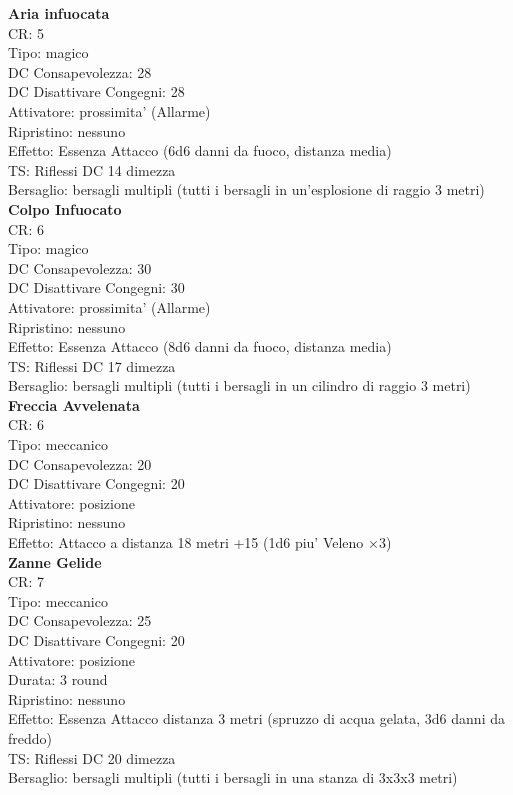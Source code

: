 \documentclass[a4paper,11pt,twoside,openany]{dndbook}
\begin{document}
\begin{multicols}{2}
\textbf{Aria infuocata}\\
CR: 5 \\
Tipo: magico \\
DC Consapevolezza: 28 \\
DC Disattivare Congegni: 28 \\
Attivatore: prossimita' (Allarme) \\
Ripristino: nessuno \\
Effetto: Essenza Attacco (6d6 danni da fuoco, distanza media)\\
TS: Riflessi DC 14 dimezza \\
Bersaglio: bersagli multipli (tutti i bersagli in un’esplosione di raggio 3 metri)\\

\textbf{Colpo Infuocato}\\
CR: 6 \\
Tipo: magico \\
DC Consapevolezza: 30 \\
DC Disattivare Congegni: 30 \\
Attivatore: prossimita' (Allarme) \\
Ripristino: nessuno \\
Effetto: Essenza Attacco (8d6 danni da fuoco, distanza media)\\
TS: Riflessi DC 17 dimezza \\
Bersaglio: bersagli multipli (tutti i bersagli in un cilindro di raggio 3 metri)\\

\textbf{Freccia Avvelenata}\\
CR: 6 \\
Tipo: meccanico \\
DC Consapevolezza: 20 \\
DC Disattivare Congegni: 20 \\
Attivatore: posizione \\
Ripristino: nessuno \\
Effetto: Attacco a distanza 18 metri +15 (1d6 piu' Veleno ×3)\\

\textbf{Zanne Gelide}\\
CR: 7 \\
Tipo: meccanico \\
DC Consapevolezza: 25 \\
DC Disattivare Congegni: 20 \\
Attivatore: posizione \\
Durata: 3 round \\
Ripristino: nessuno \\
Effetto: Essenza Attacco distanza 3 metri (spruzzo di acqua gelata, 3d6 danni da freddo) \\
TS: Riflessi DC 20 dimezza \\
Bersaglio: bersagli multipli (tutti i bersagli in una stanza di 3x3x3 metri)\\


\end{multicols}
\end{document}
